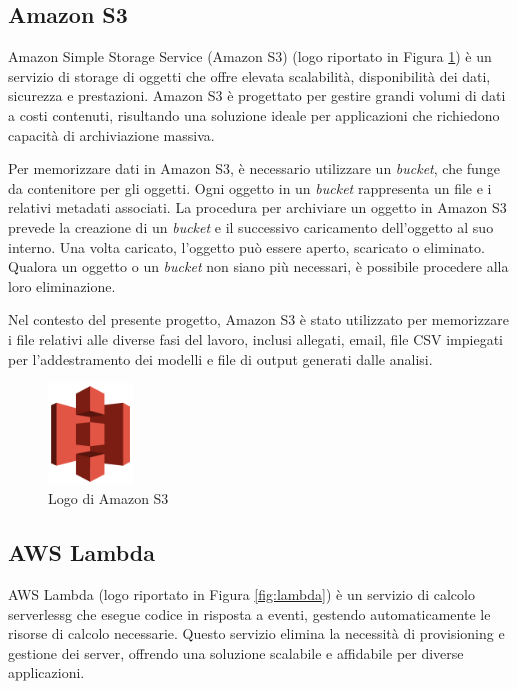 \subsection{Amazon S3}
Amazon Simple Storage Service (Amazon S3) (logo riportato in Figura \ref{fig:s3}) è un servizio di storage di oggetti che offre elevata scalabilità, disponibilità dei dati, sicurezza e prestazioni. Amazon S3 è progettato per gestire grandi volumi di dati a costi contenuti, risultando una soluzione ideale per applicazioni che richiedono capacità di archiviazione massiva.

Per memorizzare dati in Amazon S3, è necessario utilizzare un \textit{bucket}, che funge da contenitore per gli oggetti. Ogni oggetto in un \textit{bucket} rappresenta un file e i relativi metadati associati. La procedura per archiviare un oggetto in Amazon S3 prevede la creazione di un \textit{bucket} e il successivo caricamento dell'oggetto al suo interno. Una volta caricato, l'oggetto può essere aperto, scaricato o eliminato. Qualora un oggetto o un \textit{bucket} non siano più necessari, è possibile procedere alla loro eliminazione.

Nel contesto del presente progetto, Amazon S3 è stato utilizzato per memorizzare i file relativi alle diverse fasi del lavoro, inclusi allegati, email, file CSV impiegati per l'addestramento dei modelli e file di output generati dalle analisi. 


\begin{figure}[h]
  \centering
  \includegraphics[width=0.2\textwidth]{img/tecnologie/s3.png}
  \caption{Logo di Amazon S3}
  \label{fig:s3}
\end{figure}

\subsection{AWS Lambda}
AWS Lambda (logo riportato in Figura \ref{fig:lambda}) è un servizio di calcolo \gls{serverlessg} che esegue codice in risposta a eventi, gestendo automaticamente le risorse di calcolo necessarie. Questo servizio elimina la necessità di provisioning e gestione dei server, offrendo una soluzione scalabile e affidabile per diverse applicazioni.

